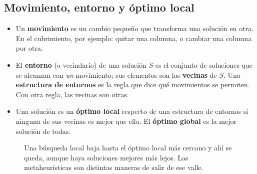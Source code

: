 \subsection{Movimiento, entorno y óptimo local}

\begin{itemize}
  \item Un \textbf{movimiento} es un cambio pequeño que transforma una solución en otra. En
        el cubrimiento, por ejemplo: quitar una columna, o cambiar una columna por otra.
  \item El \textbf{entorno} (o vecindario) de una solución $S$ es el conjunto de soluciones
        que se alcanzan con \emph{un} movimiento; sus elementos son las \textbf{vecinas} de
        $S$. Una \textbf{estructura de entornos} es la regla que dice qué movimientos se
        permiten. Con otra regla, las vecinas son otras.
  \item Una solución es un \textbf{óptimo local} respecto de una estructura de entornos si
        ninguna de sus vecinas es mejor que ella. El \textbf{óptimo global} es la mejor
        solución de todas.
\end{itemize}

\begin{figure}[H]
\centering
{}
\caption{Una búsqueda local baja hasta el óptimo local más cercano y ahí se queda, aunque
haya soluciones mejores más lejos. Las metaheurísticas son distintas maneras de salir de ese
valle.}
\label{fig:paisaje}
\end{figure}

